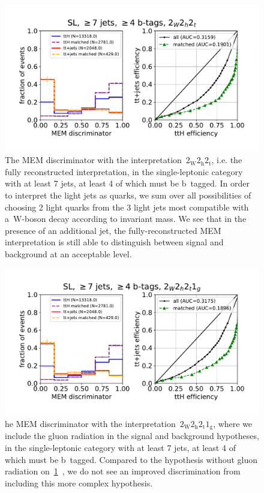 \begin{figure}
\begin{centering}
\includegraphics[width = 1.0\textwidth]{figures/mem_sl_jge7_tge4.pdf}
\caption{The MEM discriminator with the interpretation~$2_{\mathrm{W}} 2_{\mathrm{h}} 2_{\mathrm{t}}$, i.e. the fully reconstructed interpretation, in the single-leptonic category with at least 7 jets, at least 4 of which must be b~tagged. In order to interpret the light jets as quarks, we sum over all possibilities of choosing 2 light quarks from the 3 light jets most compatible with a~$\mathrm{W}$-boson decay according to invariant mass. We see that in the presence of an additional jet, the fully-reconstructed MEM interpretation is still able to distinguish between signal and background at an acceptable level.}
\label{fig:mem_sl_jge7_tge4}
\end{centering}
\end{figure}

\begin{figure}
\begin{centering}
\includegraphics[width = 1.0\textwidth]{figures/mem_sl_jge7_tge4_1g.pdf}
\caption{he MEM discriminator with the interpretation~$2_{\mathrm{W}} 2_{\mathrm{h}} 2_{\mathrm{t}} 1_{\mathrm{g}}$, where we include the gluon radiation in the signal and background hypotheses, in the single-leptonic category with at least 7 jets, at least 4 of which must be b~tagged. Compared to the hypothesis without gluon radiation on~\cref{fig:mem_sl_jge7_tge4}~, we do not see an improved discrimination from including this more complex hypothesis.}
\label{fig:mem_sl_jge7_tge4_7jet}
\end{centering}
\end{figure}